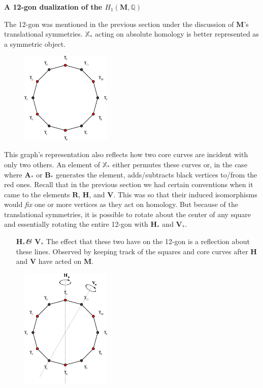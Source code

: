\documentclass[]{article}
\begin{document}
\vspace{0.1in}

\noindent\textbf{A 12-gon dualization of the $H_1(\mathbf{M},\mathbb Q)$}

The 12-gon was mentioned in the previous section under the discussion of $\mathbf{M}$'s translational symmetries. $\mathbb X_*$ acting on absolute homology is better represented as a symmetric object.

\begin{figure}[H]
\centering
\includegraphics[width=1.7in]{12gon.pdf}
\end{figure}

This graph's representation also reflects how two core curves are incident with only two others. An element of $\mathbb X_*$ either permutes these curves or, in the case where $\mathbf A_*$ or $\mathbf B_*$ generates the element, adds/subtracts black vertices to/from the red ones. Recall that in the previous section we had certain conventions when it came to the elements $\mathbf{R}$, $\mathbf{H}$, and $\mathbf{V}$. This was so that their induced isomorphisms would \emph{fix} one or more vertices as they act on homology. But because of the translational symmetries, it is possible to rotate about the center of any square and essentially rotating the entire 12-gon with $\mathbf{H}_*$ and $\mathbf{V}_*$.


\begin{minipage}{0.5\textwidth}
\vspace{0.3in}
\begin{itemize}
\item[\textbf{\emph{$\mathbf{H}_*$\& $\mathbf{V}_*$}}] The effect that these two have on the 12-gon is a reflection about these lines. Observed by keeping track of the squares and core curves after $\mathbf{H}$ and $\mathbf{V}$ have acted on $\mathbf{M}$.
\end{itemize}
\end{minipage}
\begin{minipage}{0.7\textwidth}
\begin{figure}[H]
\hspace{0.2in}\includegraphics[width=1.7in]{12gonHV.pdf}
\end{figure}
\end{minipage}
\end{document}
